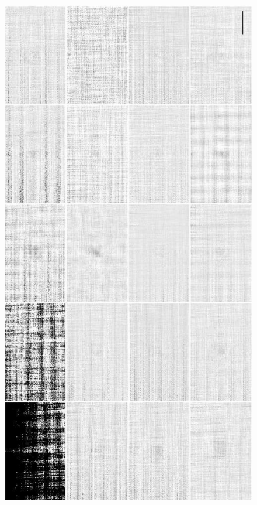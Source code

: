 \documentclass[12pt,preprint]{aastex}
\begin{document}
\begin{figure}
\begin{minipage}{6.5in}
  \end{minipage}
\vspace{0.25in}
  \begin{minipage}{6.5in}
    \begin{center}
      \includegraphics[angle=270,scale=0.6]{f7b}%

\end{center}
\end{minipage}
\end{figure}
\end{document}
